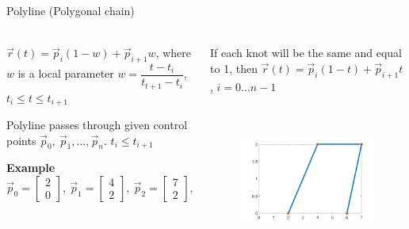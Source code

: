 \documentclass[aspectratio=169]{beamer}
\begin{document}
\begin{frame}[t]{Polyline (Polygonal chain)}
\framesubtitle{}
    \begin{columns}[T,onlytextwidth]
        \begin{column}{0.49\textwidth}
            $\vec{r}(t)=\vec{p}_i(1-w)+\vec{p}_{i+1}w$, where $w$ is a local parameter $w=\dfrac{t-t_i}{t_{t+1}-t_i}$, $t_i \leq t \leq t_{i+1}$

            Polyline passes through given control points $\vec{p}_0,\ \vec{p}_1, ..., \vec{p}_n$. $t_i \leq t_{i+1}$

            \textbf{Example}
            $\vec{p}_0 = \begin{bmatrix} 2\\ 0 \end{bmatrix},\ \vec{p}_1 = \begin{bmatrix} 4\\ 2 \end{bmatrix},\ \vec{p}_2 = \begin{bmatrix} 7\\ 2 \end{bmatrix},\ \vec{p}_3 = \begin{bmatrix} 6\\ 0 \end{bmatrix}$
        \end{column}
        \begin{column}{0.49\textwidth}
            If each knot will be the same and equal to 1, then  $\vec{r}(t)=\vec{p}_i(1-t)+\vec{p}_{i+1} t$, $i=0...n-1$
                \begin{figure}[H]
                    \centering\includegraphics[height=5cm,width=1\textwidth,keepaspectratio]{polyline_concrete.png}
                    \label{fig:polyline_concrete.png}
                \end{figure}
        \end{column}
    \end{columns}
\end{frame}
\end{document}
